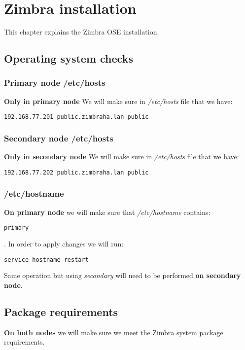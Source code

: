 

\chapter{Zimbra installation}
\label{chap:zimbra-installation}
This chapter explains the Zimbra OSE installation.

\section {Operating system checks}
\subsection {Primary node /etc/hosts}
\textbf{Only in primary node}
We will make sure in \textit{/etc/hosts} file that we have:

\begin{verbatim}
192.168.77.201 public.zimbraha.lan public
\end{verbatim}
\subsection {Secondary node /etc/hosts}
\textbf{Only in secondary node}
We will make sure in \textit{/etc/hosts} file that we have:

\begin{verbatim}
192.168.77.202 public.zimbraha.lan public
\end{verbatim}
\subsection {/etc/hostname}
\textbf{On primary node} we will make sure that \textit{/etc/hostname} contains:

\begin{verbatim}
primary
\end{verbatim}
. In order to apply changes we will run:
\begin{verbatim}
service hostname restart
\end{verbatim}

Same operation but using \textit{secondary} will need to be performed \textbf{on secondary node}.

\section {Package requirements}
\textbf{On both nodes} we will make sure we meet the Zimbra system package requirements.

